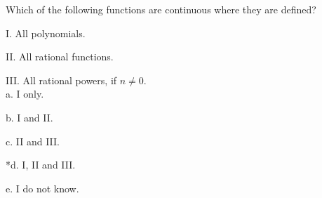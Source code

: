 
Which of the following functions are continuous where they are
defined?

I. All polynomials.

II. All rational functions.

III. All rational powers, if \(n \neq 0\).\\

a. I only.

b. I and II.

c. II and III.

*d. I, II and III.

e. I do not know.\\
